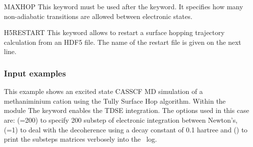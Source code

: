 \begin{keywordlist}
\item[MAXHOP]
This keyword must be used after the  keyword. It specifies how many non-adiabatic transitions are allowed between electronic states.
\item[H5RESTART]
This keyword allows to restart a surface hopping trajectory calculation from an HDF5 file.
The name of the restart file is given on the next line.
\end{keywordlist}

\subsubsection{Input examples}

This example shows an excited state CASSCF MD simulation
of a methaniminium cation using the Tully Surface Hop algorithm.
Within the  module The keyword  enables the TDSE integration. The options used in this case are:
(=200) to specify 200 substep of electronic integration between Newton's,
(=1) to deal with the decoherence using a decay constant of 0.1 hartree and
() to print the substeps matrices verbosely into the \molcas\ log.

